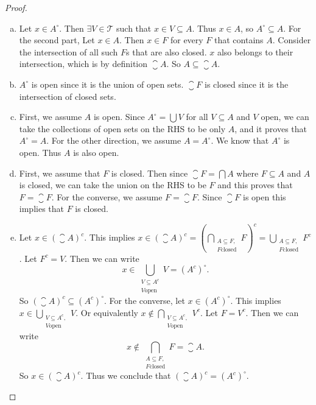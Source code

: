 \begin{proof}
	\begin{enumerate}[(a)]
		\item Let $ x \in A^\circ $. Then $ \exists V \in \mathcal{T} $ such that $ x \in V \subseteq A $. Thus $ x \in A $, so $ A^\circ \subseteq A $. For the second part, Let $ x \in A $. Then $ x \in F $ for every $ F $ that contains $ A $. Consider the intersection of all such $ F $s that are also closed. $ x $ also belongs to their intersection, which is by definition $ \closure{A} $. So $ A \subseteq \closure{A} $.
		
		\item $ A^\circ $ is open since it is the union of open sets. $ \closure{F} $ is closed since it is the intersection of closed sets. 
		
		\item First, we assume $ A $ is open. Since $ A^\circ = \bigcup V $ for all $ V\subseteq A $ and $ V $ open, we can take the collections of open sets on the RHS to be only $ A $, and it proves that $ A^\circ = A $. For the other direction, we assume $ A = A^\circ $. We know that $ A^\circ $ is open. Thus $ A $ is also open.
		
		\item First, we assume that $ F $ is closed. Then since $ \closure{F} = \bigcap A $ where $ F \subseteq A $ and $ A $ is closed, we can take the union on the RHS to be $ F $ and this proves that $ F = \closure{F} $. For the converse, we assume $ F = \closure{F} $. Since $ \closure{F} $ is open this implies that $ F $ is closed.
		
		\item Let $ x \in (\closure{A})^c $. This implies $ x \in (\closure{A})^c = (\bigcap_{\substack{A \subseteq F,\\ F\text{closed}}}F)^c = \bigcup_{\substack{A \subseteq F,\\ F\text{closed}}} F^c  $. Let $ F^c = V $. Then we can write
		\[ x \in \bigcup_{\substack{V\subseteq A^c\\ V\text{open}}} V = (A^c)^\circ. \]
		So $ (\closure{A})^c \subseteq (A^c)^\circ $. For the converse, let $ x \in (A^c)^\circ $. This implies $ x \in \bigcup_{\substack{V\subseteq A^c,\\V\text{open}}} V $. Or equivalently $ x \notin \bigcap_{\substack{V\subseteq A^c,\\V\text{open}}} V^c $. Let $ F = V^c $. Then we can write 
		\[ x\notin \bigcap_{\substack{A\subseteq F,\\ F\text{closed}}} F = \closure{A}. \]
		So $ x \in (\closure{A})^c $. Thus we conclude that $ (\closure{A})^c = (A^c)^\circ $.
		

\end{enumerate}
\end{proof}
